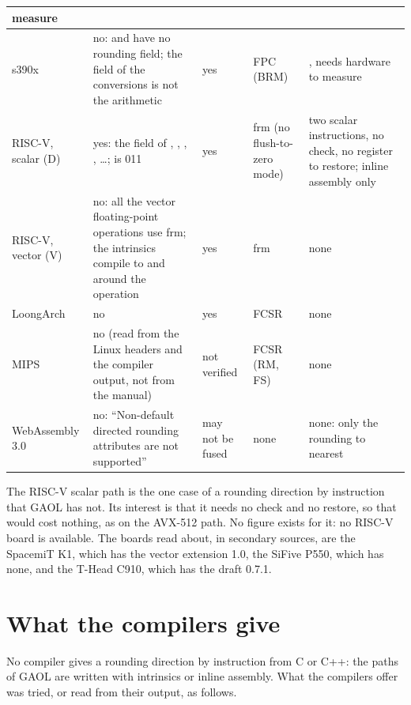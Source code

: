 \begin{longtable}{|L{2.0cm}|L{3.8cm}|L{2.1cm}|L{2.0cm}|L{2.9cm}|}
measure \\
\hline
s390x & no:  and  have no rounding field; the 
field of the conversions is not the arithmetic & yes & FPC (BRM) &
, needs hardware to measure \\
\hline
RISC-V, scalar (D) & yes: the  field of ,
, , , \ldots;
 is 011 & yes & frm (no flush-to-zero mode) & two scalar
instructions, no check, no register to restore; inline assembly only \\
\hline
RISC-V, vector (V) & no: all the vector floating-point operations use frm;
the  intrinsics compile to  and  around
the operation & yes & frm & none \\
\hline
LoongArch & no & yes & FCSR & none \\
\hline
MIPS & no (read from the Linux headers and the compiler output, not from the
manual) & not verified & FCSR (RM, FS) & none \\
\hline
WebAssembly 3.0 & no: ``Non-default directed rounding attributes are not
supported'' &  may not be fused & none & none: only the
rounding to nearest \\
\hline
\end{longtable}
\endgroup

The RISC-V scalar path is the one case of a rounding direction by
instruction that GAOL has not. Its interest is that it needs no check and no
restore, so that  would cost nothing, as on
the AVX-512 path. No figure exists for it: no RISC-V board is available. The
boards read about, in secondary sources, are the SpacemiT K1, which has the
vector extension 1.0, the SiFive P550, which has none, and the T-Head C910,
which has the draft 0.7.1.

\section{What the compilers give}
\label{sec:compilers-give}
%
%

No compiler gives a rounding direction by instruction from C or C++: the
paths of GAOL are written with intrinsics or inline assembly. What the
compilers offer was tried, or read from their output, as follows.

